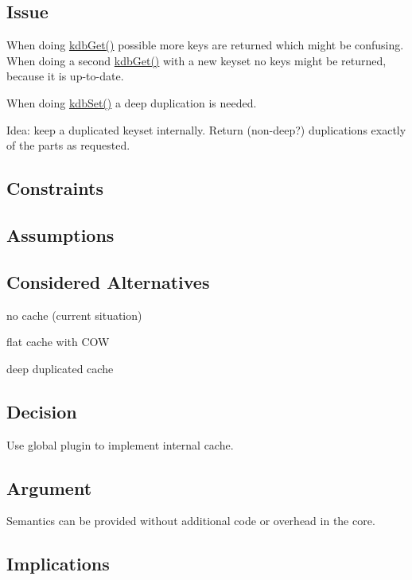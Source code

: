 \subsection*{Issue}

When doing \hyperlink{group__kdb_ga28e385fd9cb7ccfe0b2f1ed2f62453a1}{kdb\+Get()} possible more keys are returned which might be confusing. When doing a second \hyperlink{group__kdb_ga28e385fd9cb7ccfe0b2f1ed2f62453a1}{kdb\+Get()} with a new keyset no keys might be returned, because it is up-\/to-\/date.

When doing \hyperlink{group__kdb_ga11436b058408f83d303ca5e996832bcf}{kdb\+Set()} a deep duplication is needed.

Idea\+: keep a duplicated keyset internally. Return (non-\/deep?) duplications exactly of the parts as requested.

\subsection*{Constraints}

\subsection*{Assumptions}

\subsection*{Considered Alternatives}


\begin{DoxyItemize}
\item no cache (current situation)
\item flat cache with C\+O\+W
\item deep duplicated cache
\end{DoxyItemize}

\subsection*{Decision}

Use global plugin to implement internal cache.

\subsection*{Argument}

Semantics can be provided without additional code or overhead in the core.

\subsection*{Implications}

